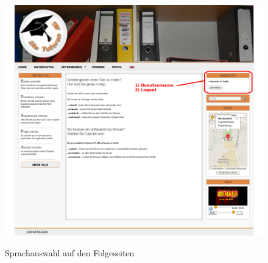 \begin{figure}[!htbp]
 \centering
 \includegraphics[width=1\textwidth]{../Screenshots/de/logout}
 \label{fig:logout}
 \caption{Sprachauswahl auf den Folgeseiten}
\end{figure}